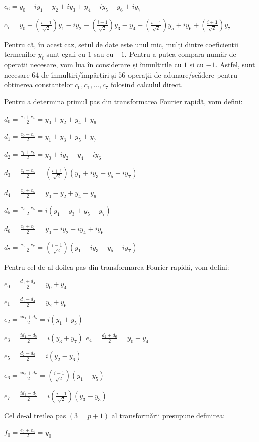 \documentclass{exam}
\begin{document}
$c_6 = y_0 - iy_1 - y_2 + iy_3 + y_4 - iy_5 - y_6 + iy_7$

$c_7 = y_0 - (\frac{i-1}{\sqrt{2}})y_1 - iy_2 - (\frac{i+1}{\sqrt{2}})y_3 - y_4 + (\frac{i-1}{\sqrt{2}})y_5 + iy_6 + (\frac{i+1}{\sqrt{2}})y_7$

Pentru că, în acest caz, setul de date este unul mic, mulți dintre coeficienții termenilor $y_i$ sunt egali cu $1$ sau cu $-1$. Pentru a putea compara număr de operații necesare, vom lua în considerare și înmulțirile cu $1$ și cu $-1$. Astfel, sunt necesare $64$ de înmultiri/împărțiri și $56$ operații de adunare/scădere pentru obținerea constantelor $c_0, c_1, ..., c_7$ folosind calculul direct.

Pentru a determina primul pas din transformarea Fourier rapidă, vom defini:

$d_0 = \frac{c_0 + c_4}{2} = y_0 +  y_2 + y_4 + y_6$

$d_1 = \frac{c_0 - c_4}{2} = y_1 +  y_3 + y_5 + y_7$

$d_2 = \frac{c_1 + c_5}{2} = y_0 +  iy_2 - y_4 - iy_6$

$d_3 = \frac{c_1 - c_5}{2} = (\frac{i+1}{\sqrt{2}})(y_1 +  iy_3 - y_5 - iy_7)$

$d_4 = \frac{c_2 + c_6}{2} = y_0 -  y_2 + y_4 - y_6$

$d_5 = \frac{c_2 - c_6}{2} = i(y_1 -  y_3 + y_5 - y_7)$

$d_6 = \frac{c_3 + c_7}{2} = y_0 -  iy_2 - iy_4 + iy_6$

$d_7 = \frac{c_3 - c_7}{2} = (\frac{i-1}{\sqrt{2}})(y_1 -  iy_3 - y_5 + iy_7)$

Pentru cel de-al doilea pas din transformarea Fourier rapidă, vom defini:

$e_0 = \frac{d_0 + d_4}{2} = y_0 +  y_4$

$e_1 = \frac{d_0 - d_4}{2} = y_2 +  y_6$

$e_2 = \frac{id_1 + d_5}{2} = i(y_1 +  y_5)$

$e_3 = \frac{id_1 - d_5}{2} = i(y_3 +  y_7)$
$e_4 = \frac{d_2 + d_6}{2} = y_0 - y_4$

$e_5 = \frac{d_2 - d_6}{2} = i(y_2 - y_6)$

$e_6 = \frac{id_3 + d_7}{2} = (\frac{i-1}{\sqrt{2}})(y_1 - y_5)$

$e_7 = \frac{id_3 - d_7}{2} = i(\frac{i-1}{\sqrt{2}})(y_3 - y_3)$

Cel de-al treilea pas $(3 = p + 1)$ al transformării presupune definirea:

$f_0 = \frac{e_0 + e_4}{2} = y_0$
\end{document}
